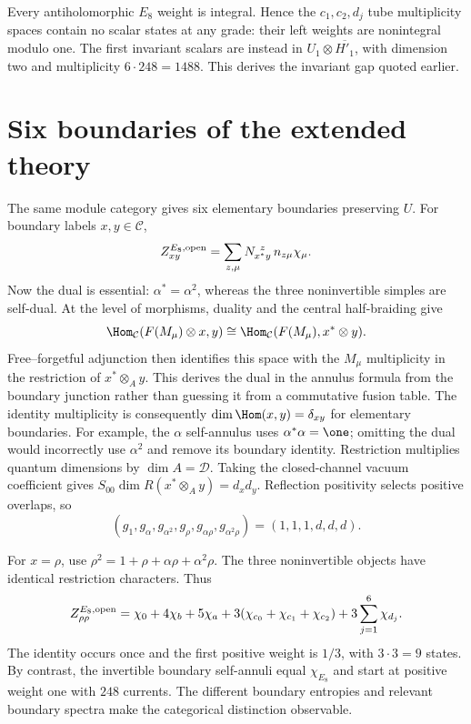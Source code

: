 Every antiholomorphic $E_8$ weight is integral. Hence the
$c_1,c_2,d_j$ tube multiplicity spaces contain no scalar states
at any grade: their left weights are nonintegral modulo one.
The first invariant scalars are instead in
$U_1\otimes\overline{H'_1}$, with dimension two and multiplicity
$6\cdot248=1488$. This derives the invariant gap quoted earlier.

\section{Six boundaries of the extended theory}

The same module category gives six elementary boundaries preserving
$U$. For boundary labels $x,y\in\mathcal C$,
\begin{equation}
 Z_{xy}^{E_8,\rm open}
 =\sum_{z,\mu}N_{x^*y}^{\ z}\,n_{z\mu}\chi_\mu.
 \label{eq:defect-E8-annulus}
\end{equation}
Now the dual is essential: $\alpha^*=\alpha^2$, whereas the
three noninvertible simples are self-dual.
At the level of morphisms, duality and the central half-braiding
give
\[
 \Hom_{\mathcal C}(F(M_\mu)\otimes x,y)
 \cong\Hom_{\mathcal C}(F(M_\mu),x^*\otimes y).
\]
Free--forgetful adjunction then identifies this space with the
$M_\mu$ multiplicity in the restriction of $x^*\otimes_Ay$.
This derives the dual in the annulus formula from the boundary
junction rather than guessing it from a commutative fusion table.
The identity multiplicity is consequently
$\dim\Hom(x,y)=\delta_{xy}$ for elementary boundaries.
For example, the $\alpha$ self-annulus uses
$\alpha^*\alpha=\one$; omitting the dual would incorrectly
use $\alpha^2$ and remove its boundary identity.
Restriction multiplies quantum dimensions by
$\dim A=\mathcal D$. Taking the closed-channel vacuum
coefficient gives
$S_{00}\dim R(x^*\otimes_Ay)=d_xd_y$.
Reflection positivity selects positive overlaps, so
\[
 (g_1,g_\alpha,g_{\alpha^2},g_\rho,g_{\alpha\rho},g_{\alpha^2\rho})
 =(1,1,1,d,d,d).
\]

\begin{example}
For $x=\rho$, use $\rho^2=1+\rho+\alpha\rho+\alpha^2\rho$.
The three noninvertible objects have identical restriction
characters. Thus
\[
 Z_{\rho\rho}^{E_8,\rm open}
 =\chi_0+4\chi_b+5\chi_a
        +3(\chi_{c_0}+\chi_{c_1}+\chi_{c_2})
        +3\sum_{j=1}^6\chi_{d_j}.
\]
The identity occurs once and the first positive weight is $1/3$,
with $3\cdot3=9$ states. By contrast, the invertible boundary
self-annuli equal $\chi_{E_8}$ and start at positive weight one
with $248$ currents. The different boundary entropies and relevant
boundary spectra make the categorical distinction observable.
\end{example}

